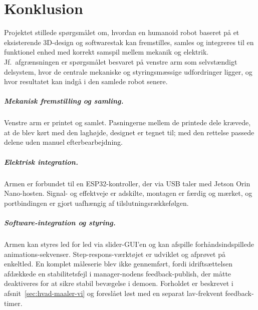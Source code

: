 \chapter{Konklusion}
\label{ch:konklusion}

\titleformat{\paragraph}[block]
  {\normalfont\bfseries}{}{0pt}{}
\titlespacing*{\paragraph}{0pt}{1.2em}{0.3em}

Projektet stillede spørgsmålet om, hvordan en humanoid robot
baseret på et eksisterende 3D-design og softwarestak kan
fremstilles, samles og integreres til en funktionel enhed med
korrekt samspil mellem mekanik og elektrik. Jf.\ afgrænsningen er
spørgsmålet besvaret på venstre arm som selvstændigt delsystem,
hvor de centrale mekaniske og styringsmæssige udfordringer ligger,
og hvor resultatet kan indgå i den samlede robot senere.

\paragraph{Mekanisk fremstilling og samling.}
Venstre arm er printet og samlet. Pasningerne mellem de printede
dele krævede, at de blev kørt med den laghøjde, designet er tegnet
til; med den rettelse passede delene uden manuel efterbearbejdning.

\paragraph{Elektrisk integration.}
Armen er forbundet til en ESP32-kontroller, der via USB taler med
Jetson Orin Nano-hosten. Signal- og effektveje er adskilte,
montagen er færdig og mærket, og portbindingen er gjort uafhængig
af tilslutningsrækkefølgen.

\paragraph{Software-integration og styring.}
Armen kan styres led for led via slider-GUI'en og kan afspille
forhåndsindspillede animations-sekvenser. Step-respons-værktøjet er
udviklet og afprøvet på enkeltled. En komplet måleserie blev ikke
gennemført, fordi idriftsættelsen afdækkede en stabilitetsfejl i
manager-nodens feedback-publish, der måtte deaktiveres for at sikre
stabil bevægelse i demoen. Forholdet er beskrevet i
afsnit~\ref{sec:hvad-maaler-vi} og foreslået løst med en separat
lav-frekvent feedback-timer.

